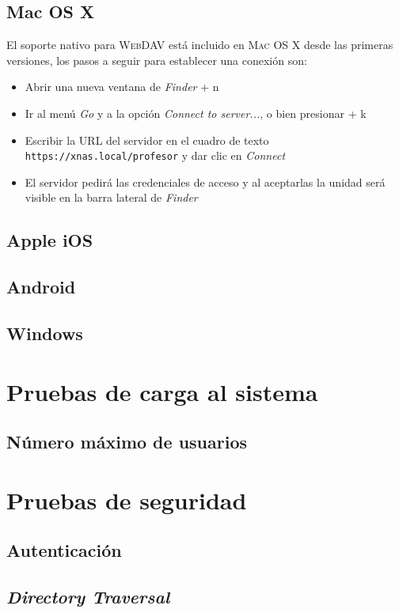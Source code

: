       \subsection {Mac OS X}

El soporte nativo para \textsc{WebDAV} est\'{a} incluido en \textsc{Mac OS X} desde las primeras versiones, los pasos a seguir para establecer una conexi\'{o}n son:

\begin{itemize}
  \item Abrir una nueva ventana de \textsl{Finder} \cmdkey + n
  \item Ir al men\'{u} \textsl{Go} y a la opci\'{o}n \textsl{Connect to server...}, o bien presionar \cmdkey + k
  \item Escribir la URL del servidor en el cuadro de texto \texttt{https://xnas.local/profesor} y dar clic en \textsl{Connect}
  \item El servidor pedir\'{a} las credenciales de acceso y al aceptarlas la unidad ser\'{a} visible en la barra lateral de \textsl{Finder}
\end{itemize}

      \subsection {Apple iOS}
      \subsection {Android}
      \subsection {Windows}
    \section {Pruebas de carga al sistema}
      \subsection {N\'{u}mero m\'{a}ximo de usuarios}
    \section {Pruebas de seguridad}
      \subsection {Autenticaci\'{o}n}
      \subsection {\textit{Directory Traversal}}
